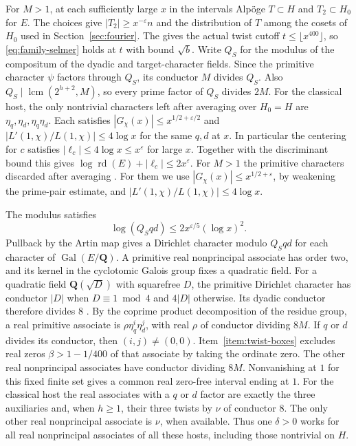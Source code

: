For \(M>1\), at each sufficiently large \(x\) in the intervals Alp\"oge
\(T\subset H\) and \(T_2\subset H_0\) for \(E\). The choices
give \(|T_2|\ge x^{-\varepsilon}n\) and the distribution of \(T\) among
the cosets of \(H_0\) used in Section~\ref{sec:fourier}. The
 gives
the actual twist cutoff \(t\le\lfloor x^{400}\rfloor\), so
\eqref{eq:family-selmer} holds at \(t\) with bound \(\sqrt b\).
Write \(Q_S\) for the modulus of the compositum of the dyadic and
target-character fields. Since the primitive character \(\psi\)
factors through \(Q_S\), its conductor \(M\) divides \(Q_S\).
Also \(Q_S\mid\operatorname{lcm}(2^{h+2},M)\), so every prime factor of
\(Q_S\) divides \(2M\).
For the classical host, the only nontrivial characters left after
averaging over \(H_0=H\) are \(\eta_q,\eta_d,\eta_q\eta_d\). Each
satisfies \(|G_\chi(x)|\le x^{1/2+\varepsilon/2}\) and
\(|L'(1,\chi)/L(1,\chi)|\le4\log x\) for the same \(q,d\) at \(x\).
In particular the centering for \(c\) satisfies
\(|\ell_c|\le4\log x\le x^\varepsilon\) for large \(x\).
Together with the discriminant bound this gives
\(\log\operatorname{rd}(E)+|\ell_c|\le2x^\varepsilon\).
For \(M>1\) the primitive characters discarded after averaging
.
For them we use \(|G_\chi(x)|\le x^{1/2+\varepsilon}\), by weakening
the prime-pair estimate, and
\(|L'(1,\chi)/L(1,\chi)|\le4\log x\).

The modulus satisfies
\[
  \log(Q_Sqd)\le 2x^{\varepsilon/5}(\log x)^2 .
\]
Pullback by the Artin map gives a Dirichlet character modulo \(Q_Sqd\)
for each character of \(\operatorname{Gal}(E/\mathbf Q)\).
A primitive real nonprincipal associate has order two, and its
kernel in the cyclotomic Galois group fixes a quadratic field. For a
quadratic field \(\mathbf Q(\sqrt D)\) with squarefree \(D\), the
primitive Dirichlet character has conductor \(|D|\) when
\(D\equiv1\bmod4\) and \(4|D|\) otherwise. Its dyadic conductor
therefore divides \(8\) \cite[Ch.~V, Example~3.11]{f1milne-cft}.
By the coprime product decomposition of the residue group, a real
primitive associate is \(\rho\eta_q^i\eta_d^j\), with real \(\rho\)
of conductor dividing \(8M\). If \(q\) or \(d\) divides its conductor,
then \((i,j)\ne(0,0)\). Item~\ref{item:twist-boxes} excludes real zeros
\(\beta>1-1/400\) of that associate by taking the ordinate zero.
The other real nonprincipal associates have
conductor dividing \(8M\). Nonvanishing at \(1\) for this fixed finite
set gives a common real zero-free interval ending at \(1\).
For the classical host the real associates with a \(q\) or \(d\)
factor are exactly the three auxiliaries and, when \(h\ge1\), their
three twists by \(\nu\) of conductor \(8\). The only other real
nonprincipal associate is \(\nu\), when available. Thus one
\(\delta>0\) works for all real nonprincipal associates of all
these hosts, including those nontrivial on \(H\).

